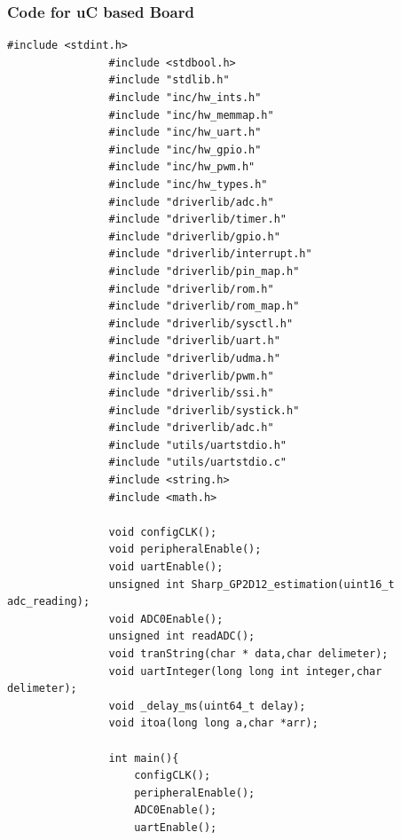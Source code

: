 \documentclass[a4paper,12pt,oneside]{article}
\begin{document}
			\subsubsection{\textbf{Code for uC based Board}}
			\begin{lstlisting}[style=CStyle]
				#include <stdint.h>
				#include <stdbool.h>
				#include "stdlib.h"
				#include "inc/hw_ints.h"
				#include "inc/hw_memmap.h"
				#include "inc/hw_uart.h"
				#include "inc/hw_gpio.h"
				#include "inc/hw_pwm.h"
				#include "inc/hw_types.h"
				#include "driverlib/adc.h"
				#include "driverlib/timer.h"
				#include "driverlib/gpio.h"
				#include "driverlib/interrupt.h"
				#include "driverlib/pin_map.h"
				#include "driverlib/rom.h"
				#include "driverlib/rom_map.h"
				#include "driverlib/sysctl.h"
				#include "driverlib/uart.h"
				#include "driverlib/udma.h"
				#include "driverlib/pwm.h"
				#include "driverlib/ssi.h"
				#include "driverlib/systick.h"
				#include "driverlib/adc.h"
				#include "utils/uartstdio.h"
				#include "utils/uartstdio.c"
				#include <string.h>
				#include <math.h>
				
				void configCLK();
				void peripheralEnable();
				void uartEnable();
				unsigned int Sharp_GP2D12_estimation(uint16_t adc_reading);
				void ADC0Enable();
				unsigned int readADC();
				void tranString(char * data,char delimeter);
				void uartInteger(long long int integer,char delimeter);
				void _delay_ms(uint64_t delay);
				void itoa(long long a,char *arr);
				
				int main(){
					configCLK();
					peripheralEnable();
					ADC0Enable();
					uartEnable();
					

\end{lstlisting}
\end{document}
